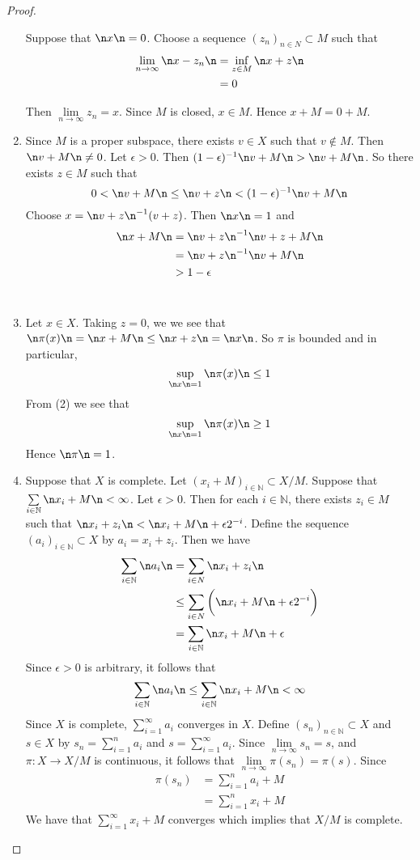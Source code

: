 \documentclass[12pt]{amsart}
\newcommand{\ep}{\epsilon}
\newcommand{\N}{\mathbb{N}}
\newcommand{\limn}{\lim \limits_{n \rightarrow \infty}}
\begin{document}
\begin{proof}
\begin{enumerate}
		Suppose that $\n x \n =0$. Choose a sequence $(z_n)_{n \in N} \subset M$ such that 
		\begin{align*}
			\lim\limits_{n \rightarrow \infty} \n x - z_n \n
			& = \inf_{z \in M} \n x+ z \n\\
			& = 0
		\end{align*} 
		
		Then $\limn z_n =x$. Since $M$ is closed, $x \in M$. Hence $x+M=0+M$. \vspace{1cm}\\
		\item Since $M$ is a proper subspace, there exists $v \in X$ such that $v \not \in M$. Then $\n v +M \n \neq 0$. Let $\ep >0$. Then $(1-\ep)^{-1}\n v+M \n > \n v+M \n$. So there exists $z \in M$ such that $$0< \n v+M\n \leq \n v+z \n < (1-\ep)^{-1} \n v+M \n$$ Choose $x = \n v+z \n ^{-1}(v+z)$. Then $\n x \n =1$ and 
		\begin{align*}
			\n x+M \n
			&= \n v+z \n ^{-1} \n v+z +M \n\\
			&= \n v+z \n ^{-1} \n v +M \n\\
			&> 1-\ep
		\end{align*}\vspace{.5cm}\\
		\item Let $x \in X$. Taking $z=0$, we we see that $\n \pi(x) \n =\n x+M \n \leq \n x+z \n = \n x \n$. So $\pi$ is bounded and in particular, $$\sup_{\n x \n =1} \n \pi(x) \n \leq 1$$ 
		From (2) we see that $$\sup_{\n x \n =1} \n \pi(x) \n \geq 1$$
		Hence $\n \pi\n = 1$. \vspace{.5cm}\\
		\item Suppose that $X$ is complete. Let $(x_i+M)_{i\in \N} \subset X/M$. Suppose that $\sum\limits_{i\in \N} \n x_i+M \n < \infty$. Let $\ep>0$. Then for each $i \in \N$, there exists $z_i \in M$ such that $\n x_i +z_i \n < \n x_i +M \n + \ep2^{-i}$. Define the sequence $(a_i)_{i\in \N} \subset X$ by $a_i = x_i +z_i$. Then we have 
		\begin{align*}
			\sum_{i\in \N} \n a_i \n 
			&= \sum_{i \in N} \n x_i + z_i \n \\
			&\leq \sum_{i \in N} \bigg (\n x_i +M \n + \ep2^{-i} \bigg)\\
			&= \sum_{i\in \N} \n x_i+M\n + \ep
		\end{align*}
		Since $\ep>0$ is arbitrary, it follows that $$\sum_{i\in \N} \n a_i \n \leq \sum_{i\in \N} \n x_i+M\n < \infty$$
		Since $X$ is complete, $\sum\limits_{i=1}^{\infty}a_i$ converges in $X$. Define $(s_n)_{n \in \N} \subset X$ and $s \in X$ by $s_n = \sum\limits_{i =1}^n a_i$ and $s = \sum\limits_{i=1}^\infty a_i $. Since $\limn s_n = s$, and $\pi: X \rightarrow X/M$ is continuous, it follows that $\limn \pi(s_n) = \pi(s)$. Since 
		\begin{align*}
			\pi(s_n) 
			&= \sum_{i=1}^n a_i +M\\
			&= \sum_{i=1}^n x_i +M
		\end{align*} 
		We have that $\sum\limits_{i=1}^{\infty}x_i +M$ converges which implies that $X/M$ is complete.
	\end{enumerate}
\end{proof}
\end{document}
